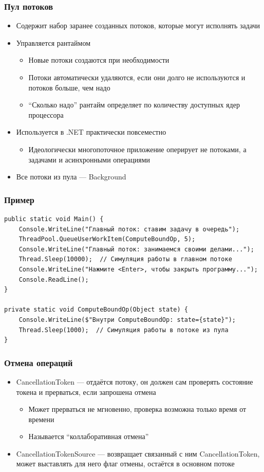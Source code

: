 \documentclass[xetex,mathserif,serif]{beamer}
\begin{document}
	\begin{frame}
		\frametitle{Пул потоков}
		\begin{itemize}
			\item Содержит набор заранее созданных потоков, которые могут исполнять задачи
			\item Управляется рантаймом
			\begin{itemize}
				\item Новые потоки создаются при необходимости
				\item Потоки автоматически удаляются, если они долго не используются и потоков больше, чем надо
				\item ``Сколько надо'' рантайм определяет по количеству доступных ядер процессора
			\end{itemize}
			\item Используется в .NET практически повсеместно
			\begin{itemize}
				\item Идеологически многопоточное приложение оперирует не потоками, а задачами и асинхронными операциями
			\end{itemize}
			\item Все потоки из пула --- Background
		\end{itemize}
	\end{frame}

	\begin{frame}[fragile]
		\frametitle{Пример}
		\begin{verbatim}
public static void Main() {
    Console.WriteLine("Главный поток: ставим задачу в очередь");
    ThreadPool.QueueUserWorkItem(ComputeBoundOp, 5);
    Console.WriteLine("Главный поток: занимаемся своими делами...");
    Thread.Sleep(10000);  // Симуляция работы в главном потоке
    Console.WriteLine("Нажмите <Enter>, чтобы закрыть программу...");
    Console.ReadLine();
}

private static void ComputeBoundOp(Object state) {
    Console.WriteLine($"Внутри ComputeBoundOp: state={state}");
    Thread.Sleep(1000);  // Симуляция работы в потоке из пула
}
		\end{verbatim}
	\end{frame}

	\begin{frame}
		\frametitle{Отмена операций}
		\begin{itemize}
			\item CancellationToken --- отдаётся потоку, он должен сам проверять состояние токена и прерваться, если запрошена отмена
			\begin{itemize}
				\item Может прерваться не мгновенно, проверка возможна только время от времени
				\item Называется ``коллаборативная отмена''
			\end{itemize}
			\item CancellationTokenSource --- возвращает связанный с ним CancellationToken, может выставлять для него флаг отмены, остаётся в основном потоке
		\end{itemize}
	\end{frame}
\end{document}
